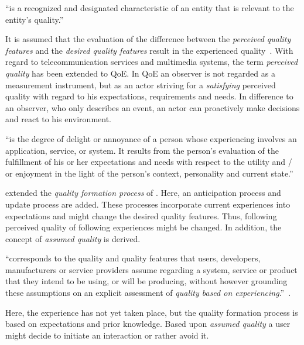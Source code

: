 \begin{definition}
``is a recognized and designated characteristic of an entity that is relevant to the entity's quality.''~\citep[][p.~17]{jekosch_voice_2005}
\end{definition}

It is assumed that the evaluation of the difference between the \emph{perceived quality features} and the \emph{desired quality features} result in the experienced quality~\citep[p.~23]{raake_quality_2014}.
With regard to telecommunication services and multimedia systems, the term \emph{perceived quality} has been extended to \acf{QoE}.
In \ac{QoE} an observer is not regarded as a measurement instrument, but as an actor striving for a \emph{satisfying} perceived quality with regard to his expectations, requirements and needs.
In difference to an observer, who only describes an event, an actor can proactively make decisions and react to his environment.  

\begin{definition}
``is the degree of delight or annoyance of a person whose experiencing involves an application, service, or system.
It results from the person’s evaluation of the fulfillment of his or her expectations and needs with respect to the utility and / or enjoyment in the light of the person’s context, personality and current state.''~\citep[][p.~19]{raake_quality_2014}
\end{definition}

\citet{raake_quality_2014} extended the \emph{quality formation process} of \citet{jekosch_voice_2005}.
Here, an anticipation process and update process are added.
These processes incorporate current experiences into expectations and might change the desired quality features.
Thus, following perceived quality of following experiences might be changed.
In addition, the concept of \emph{assumed quality} is derived.
\begin{definition}\label{def:assumedquality}
``corresponds to the quality and quality features that users, developers, manufacturers or service providers assume regarding a system, service or product that they intend to be using, or will be producing, without however grounding these assumptions on an explicit assessment of \textit{quality based on experiencing}.''~\citep[][p.~17]{raake_quality_2014}.
\end{definition}
Here, the experience has not yet taken place, but the quality formation process is based on expectations and prior knowledge.
Based upon \emph{assumed quality} a user might decide to initiate an interaction or rather avoid it.

